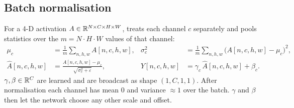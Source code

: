 \subsection{Batch normalisation}
\label{sec:bn}

\begin{idea}
For a 4-D activation $A\in\mathbb{R}^{N\times C\times H\times W}$,  treats each channel $c$ separately and pools statistics over the $m = N\cdot H\cdot W$ values of that channel:
\begin{align*}
  \mu_c &= \frac1m\sum_{n,h,w} A[n,c,h,w], &
  \sigma_c^2 &= \frac1m\sum_{n,h,w}\big(A[n,c,h,w]-\mu_c\big)^2, \\
  \hat A[n,c,h,w] &= \frac{A[n,c,h,w]-\mu_c}{\sqrt{\sigma_c^2+\varepsilon}}, &
  Y[n,c,h,w] &= \gamma_c\,\hat A[n,c,h,w] + \beta_c .
\end{align*}
$\gamma,\beta\in\mathbb{R}^{C}$ are learned and are broadcast as shape $(1,C,1,1)$. After normalisation each channel has mean 0 and variance $\approx1$ over the batch. $\gamma$ and $\beta$ then let the network choose any other scale and offset.
\end{idea}

\begin{center}
\end{center}

